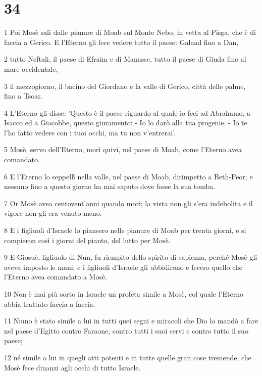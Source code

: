 \chapter{34}

\par 1 Poi Mosè salì dalle pianure di Moab sul Monte Nebo, in vetta al Pisga, che è di faccia a Gerico. E l'Eterno gli fece vedere tutto il paese: Galaad fino a Dan,
\par 2 tutto Neftali, il paese di Efraim e di Manasse, tutto il paese di Giuda fino al mare occidentale,
\par 3 il mezzogiorno, il bacino del Giordano e la valle di Gerico, città delle palme, fino a Tsoar.
\par 4 L'Eterno gli disse: 'Questo è il paese riguardo al quale io feci ad Abrahamo, a Isacco ed a Giacobbe, questo giuramento: - Io lo darò alla tua progenie. - Io te l'ho fatto vedere con i tuoi occhi, ma tu non v'entrerai'.
\par 5 Mosè, servo dell'Eterno, morì quivi, nel paese di Moab, come l'Eterno avea comandato.
\par 6 E l'Eterno lo seppellì nella valle, nel paese di Moab, dirimpetto a Beth-Peor; e nessuno fino a questo giorno ha mai saputo dove fosse la sua tomba.
\par 7 Or Mosè avea centovent'anni quando morì; la vista non gli s'era indebolita e il vigore non gli era venuto meno.
\par 8 E i figliuoli d'Israele lo piansero nelle pianure di Moab per trenta giorni, e si compieron così i giorni del pianto, del lutto per Mosè.
\par 9 E Giosuè, figliuolo di Nun, fu riempito dello spirito di sapienza, perché Mosè gli aveva imposto le mani; e i figliuoli d'Israele gli ubbidirono e fecero quello che l'Eterno avea comandato a Mosè.
\par 10 Non è mai più sorto in Israele un profeta simile a Mosè, col quale l'Eterno abbia trattato faccia a faccia.
\par 11 Niuno è stato simile a lui in tutti quei segni e miracoli che Dio lo mandò a fare nel paese d'Egitto contro Faraone, contro tutti i suoi servi e contro tutto il suo paese;
\par 12 né simile a lui in quegli atti potenti e in tutte quelle gran cose tremende, che Mosè fece dinanzi agli occhi di tutto Israele.


